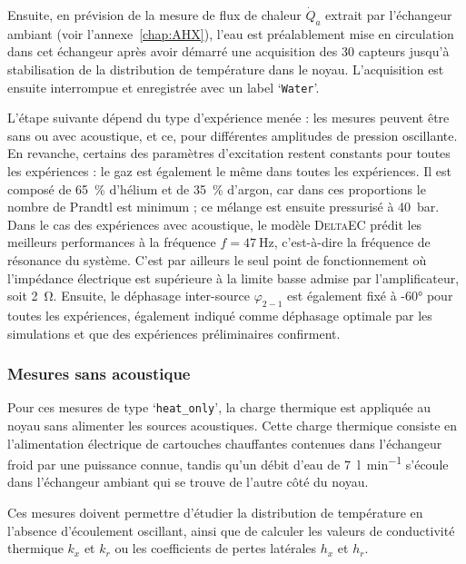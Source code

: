 Ensuite, en prévision de la mesure de flux de chaleur $\dot Q_a$ extrait par l'échangeur ambiant (voir l'annexe~\ref{chap:AHX}), l'eau est préalablement mise en circulation dans cet échangeur après avoir démarré une acquisition des 30 capteurs jusqu'à stabilisation de la distribution de température dans le noyau. L'acquisition est ensuite interrompue et enregistrée avec un label `\texttt{Water}'. \bigskip

L'étape suivante dépend du type d'expérience menée : les mesures peuvent être sans ou avec acoustique, et ce, pour  différentes amplitudes de pression oscillante.  En revanche, certains des paramètres d'excitation restent constants pour toutes les expériences :  le gaz est également le même dans toutes les expériences. Il est composé de \qty{65}{\percent} d'hélium et de \qty{35}{\percent} d'argon, car dans ces proportions le nombre de Prandtl est minimum \cite{belcher_working_1999} ; ce mélange est ensuite pressurisé à \qty{40}{\bar}. Dans le cas des expériences avec acoustique, le modèle \textsc{DeltaEC} prédit les meilleurs performances à la fréquence $f=\qty{47}{\hertz}$, c'est-à-dire la fréquence de résonance du système. C'est par ailleurs le seul point de fonctionnement où l'impédance électrique est supérieure à la limite basse admise par l'amplificateur, soit \qty{2}{\ohm}. Ensuite, le déphasage inter-source $\varphi_{2-1}$ est également fixé à \ang{-60} pour toutes les expériences, également indiqué comme déphasage optimale par les simulations et que des expériences préliminaires confirment.

\subsubsection{Mesures sans acoustique}\label{chap:MesureSansAcou}
Pour ces mesures de type `\texttt{heat\_{}only}', la charge thermique est appliquée au noyau sans alimenter les sources acoustiques. Cette charge thermique consiste en l'alimentation électrique de cartouches chauffantes contenues dans l'échangeur froid par une puissance connue, tandis qu'un débit d'eau de \qty{7}{\litre\per\minute} s'écoule dans l'échangeur ambiant qui se trouve de l'autre côté du noyau. 

Ces mesures doivent permettre d'étudier la distribution de température en l'absence d'écoulement oscillant, ainsi que de calculer les valeurs de conductivité thermique $k_x$ et $k_r$ ou les coefficients de pertes latérales $h_x$ et $h_r$.\medskip

